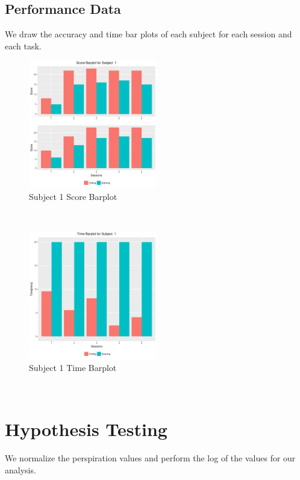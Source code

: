 \documentclass[12pt,epsf]{report}
\begin{document}
\subsection*{Performance Data}
We draw the accuracy and time bar plots of each subject for each session and each task.\\
\begin{figure}[!htb]
	\centering
	\includegraphics[width=0.5\textwidth]{1Score_barplot.pdf}
	\caption{Subject 1 Score Barplot}
	\centering
\end{figure}
\\
\begin{figure}[!htb]
	\centering
	\includegraphics[width=0.5\textwidth]{1Time_barplot.pdf}
	\caption{Subject 1 Time Barplot}
	\centering
\end{figure}\\
\section*{Hypothesis Testing}
We normalize the perspiration values and perform the log of the values for our analysis.\\
\end{document}
